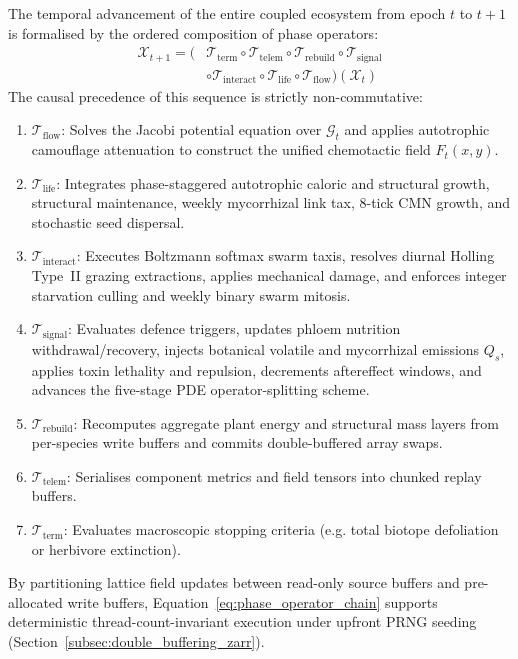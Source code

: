 The temporal advancement of the entire coupled ecosystem from epoch $t$ to $t+1$ is formalised by the ordered composition of phase operators:
\begin{align}
  \mathcal{X}_{t+1} = \big( &\mathcal{T}_{\text{term}} \circ \mathcal{T}_{\text{telem}} \circ \mathcal{T}_{\text{rebuild}} \circ \mathcal{T}_{\text{signal}} \nonumber \\
  &\circ \mathcal{T}_{\text{interact}} \circ \mathcal{T}_{\text{life}} \circ \mathcal{T}_{\text{flow}} \big) \left( \mathcal{X}_t \right)
  \label{eq:phase_operator_chain}
\end{align}
The causal precedence of this sequence is strictly non-commutative:
\begin{enumerate}
  \item $\mathcal{T}_{\text{flow}}$: Solves the Jacobi potential equation over $\mathcal{G}_t$ and applies autotrophic camouflage attenuation to construct the unified chemotactic field $F_t(x, y)$.
  \item $\mathcal{T}_{\text{life}}$: Integrates phase-staggered autotrophic caloric and structural growth, structural maintenance, weekly mycorrhizal link tax, 8-tick CMN growth, and stochastic seed dispersal.
  \item $\mathcal{T}_{\text{interact}}$: Executes Boltzmann softmax swarm taxis, resolves diurnal Holling Type~II grazing extractions, applies mechanical damage, and enforces integer starvation culling and weekly binary swarm mitosis.
  \item $\mathcal{T}_{\text{signal}}$: Evaluates defence triggers, updates phloem nutrition withdrawal/recovery, injects botanical volatile and mycorrhizal emissions $Q_s$, applies toxin lethality and repulsion, decrements aftereffect windows, and advances the five-stage PDE operator-splitting scheme.
  \item $\mathcal{T}_{\text{rebuild}}$: Recomputes aggregate plant energy and structural mass layers from per-species write buffers and commits double-buffered array swaps.
  \item $\mathcal{T}_{\text{telem}}$: Serialises component metrics and field tensors into chunked replay buffers.
  \item $\mathcal{T}_{\text{term}}$: Evaluates macroscopic stopping criteria (e.g. total biotope defoliation or herbivore extinction).
\end{enumerate}

By partitioning lattice field updates between read-only source buffers and pre-allocated write buffers, Equation~\eqref{eq:phase_operator_chain} supports deterministic thread-count-invariant execution under upfront PRNG seeding (Section~\ref{subsec:double_buffering_zarr}).
